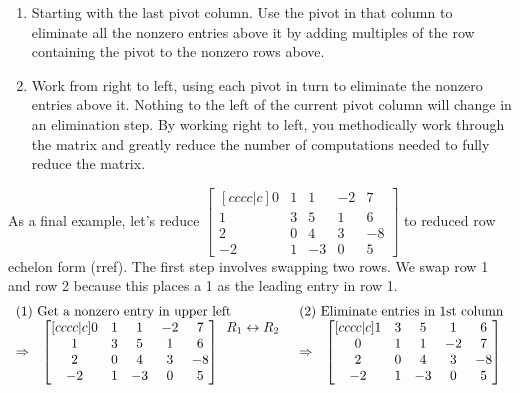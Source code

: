 \begin{enumerate}
\begin{enumerate}
	\item Starting with the last pivot column. Use the pivot in that column to eliminate all the nonzero entries above it by adding multiples of the row containing the pivot to the nonzero rows above. 
	\item Work from right to left, using each pivot in turn to eliminate the nonzero entries above it. Nothing to the left of the current pivot column will change in an elimination step.  By working right to left, you methodically work through the matrix and greatly reduce the number of computations needed to fully reduce the matrix.
\end{enumerate}
\end{enumerate}


\begin{example}\label{ex rref last}
As a final example, let's reduce 
{\small $
\begin{bmatrix}[cccc|c]
 0 & 1 & 1 & -2 & 7 \\
  1 & 3 & 5 & 1 & 6 \\
 2 & 0 & 4 & 3 & -8 \\
 -2 & 1 & -3 & 0 & 5
\end{bmatrix}
$} to reduced row echelon form (rref). The first step involves swapping two rows. We swap row 1 and row 2 because this places a 1 as the leading entry in row 1.
{\small  $$\begin{array}{rlcl}
\multicolumn{2}{l}{\text{(1) Get a nonzero entry in upper left}}&
\multicolumn{2}{l}{\text{(2) Eliminate entries in 1st column}}\\
\Rightarrow&
\begin{bmatrix}[cccc|c]
 0 & 1 & 1 & -2 & 7 \\
  1 & 3 & 5 & 1 & 6 \\
 2 & 0 & 4 & 3 & -8 \\
 -2 & 1 & -3 & 0 & 5
\end{bmatrix}
  \begin{array}{lr} R_1\leftrightarrow R_2 \\ \ \\ \ \\ \ \end{array}
&\Rightarrow& 
\begin{bmatrix}[cccc|c]
  1 & 3 & 5 & 1 & 6 \\
 0 & 1 & 1 & -2 & 7 \\
 2 & 0 & 4 & 3 & -8 \\
 -2 & 1 & -3 & 0 & 5
\end{bmatrix}

\end{array}$$}
\end{example}
